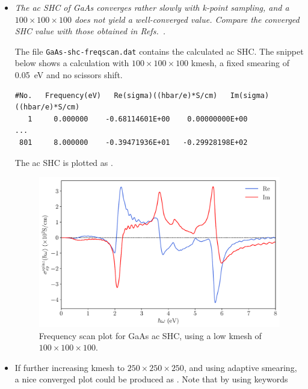\begin{itemize}
	\item {\it The ac SHC of GaAs converges rather slowly with k-point sampling, and a $100 \times 100 \times 100$ does not yield a well-converged value.
	Compare the converged SHC value with those obtained in Refs.~.}

	The file {\tt GaAs-shc-freqscan.dat} contains the calculated ac SHC. The snippet below shows a calculation with $100\times100\times100$ kmesh, a fixed smearing of 0.05~eV and no scissors shift.

\begin{tcolorbox}[title=$100\times100\times100$ kmesh,sharp corners,boxrule=0.5pt]
{\small
\begin{verbatim}
#No.   Frequency(eV)   Re(sigma)((hbar/e)*S/cm)   Im(sigma)((hbar/e)*S/cm)
   1     0.000000    -0.68114601E+00    0.00000000E+00
...
 801     8.000000    -0.39471936E+01   -0.29928198E+02
\end{verbatim}
}
\end{tcolorbox}

The ac SHC is plotted as .
\begin{figure}[htb!]
\centering
\includegraphics[width=.8\columnwidth]{figure/example30/gaas_freqscan_100kpt.pdf}
\caption{Frequency scan plot for GaAs ac SHC, using 
	a low kmesh of $100\times100\times100$.}
\label{fig30.1}
\end{figure}

\item If further increasing kmesh to $250\times250\times250$, and using adaptive smearing, 
a nice converged plot could be produced as . 
Note that by using keywords 
\end{itemize}
